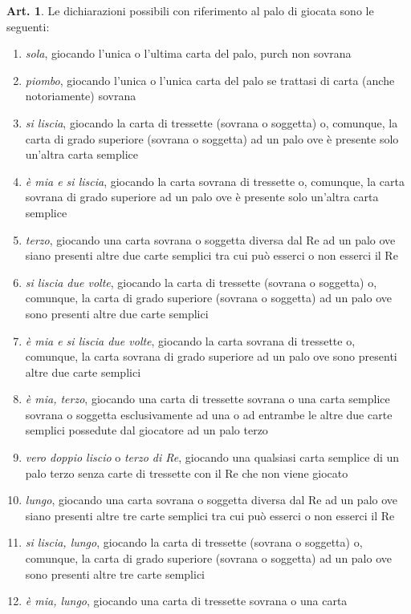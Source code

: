 \documentclass[italian,a4paper]{book}
\theoremstyle{definition}
\newtheorem{art}{Art.}
\newenvironment{packedenum}{
\begin{enumerate}
  \setlength{\itemsep}{1pt}
  \setlength{\parskip}{0pt}
  \setlength{\parsep}{0pt}
}{\end{enumerate}}
\begin{document}
\begin{art}\label{classic.dich.list}
Le dichiarazioni possibili con riferimento al palo di giocata sono le seguenti:
\begin{packedenum}
\item        \emph{sola}, giocando l’unica o l’ultima carta del palo, purch non
sovrana
\item        \emph{piombo}, giocando l’unica o l’unica carta del palo se trattasi di
carta (anche notoriamente) sovrana
\item        \emph{si liscia}, giocando la carta di tressette (sovrana o soggetta) o,
comunque, la carta di grado superiore (sovrana o soggetta) ad un palo ove è
presente solo un’altra carta semplice
\item        \emph{è mia e si liscia}, giocando la carta sovrana di tressette o,
comunque, la carta sovrana di grado superiore ad un palo ove è presente solo
un’altra carta semplice
\item        \emph{terzo}, giocando una carta sovrana o soggetta diversa dal Re ad un
palo ove siano presenti altre due carte semplici tra cui può esserci o non
esserci il Re
\item       \emph{si liscia due volte}, giocando la carta di tressette (sovrana o
soggetta) o, comunque, la carta di grado superiore (sovrana o soggetta) ad
un palo ove sono  presenti altre due carte semplici
\item        \emph{è mia e si liscia due volte}, giocando la carta sovrana di
tressette o, comunque, la carta sovrana di grado superiore ad un palo ove
sono presenti altre due carte semplici
\item       \emph{è mia, terzo}, giocando una carta di tressette sovrana o una carta
semplice sovrana o soggetta esclusivamente ad una o ad entrambe le altre due
carte semplici possedute dal giocatore ad un palo terzo 
\item        \emph{vero doppio liscio} o \emph{terzo di Re}, giocando una qualsiasi carta
semplice di un palo terzo senza carte di tressette con il Re che non viene
giocato
\item      \emph{lungo}, giocando una carta sovrana o soggetta diversa dal Re ad un
palo ove siano presenti altre tre carte semplici tra cui può esserci o non
esserci il Re
\item     \emph{si liscia, lungo}, giocando la carta di tressette (sovrana o
soggetta) o, comunque, la carta di grado superiore (sovrana o soggetta) ad
un palo ove sono  presenti altre tre carte semplici
\item      \emph{è mia, lungo}, giocando una carta di tressette sovrana o una carta

\end{packedenum}
\end{art}
\end{document}
